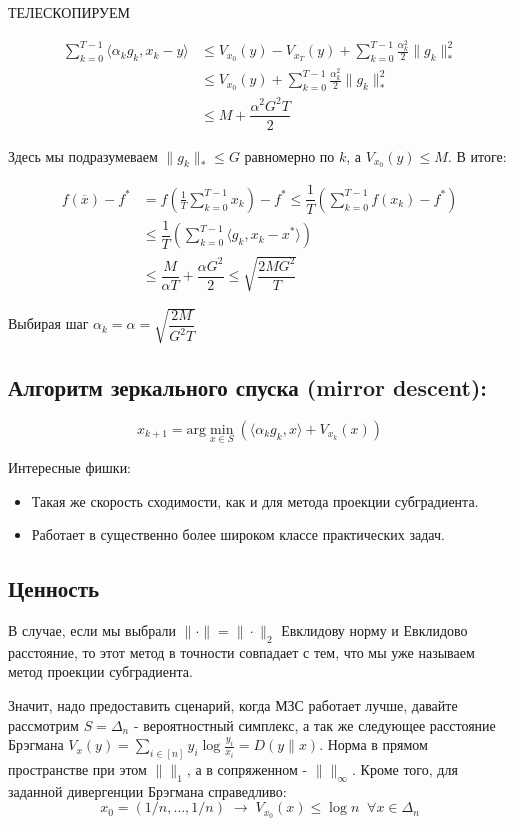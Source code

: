 \documentclass[a4paper,12pt]{article}
\theoremstyle{plain} %
\theoremstyle{definition} %
\theoremstyle{remark} %
\theoremstyle{definition}
\theoremstyle{definition}
\let\leq\leqslant
\begin{document}
ТЕЛЕСКОПИРУЕМ

\begin{align*}
\sum\limits_{k = 0}^{T-1} \langle \alpha_k g_k, x_k - y\rangle &\leq  V_{x_0}(y) - V_{x_{T}}(y) + \sum\limits_{k = 0}^{T-1}\frac{\alpha_k^2}{2} \|g_k\|_*^2 \\
&\leq V_{x_0}(y)  + \sum\limits_{k = 0}^{T-1}\frac{\alpha_k^2}{2} \|g_k\|_*^2 \\
&\leq M + \dfrac{\alpha^2 G^2 T}{2} 
\end{align*}

Здесь мы подразумеваем $\|g_k\|_* \leq G$ равномерно по $k$, а $V_{x_0}(y) \leq M$. В итоге:

\begin{align*}
f(\overline{x}) - f^* &= f \left( \frac{1}{T}\sum\limits_{k=0}^{T-1} x_k \right) - f^* \leq \dfrac{1}{T} \left( \sum\limits_{k=0}^{T-1} f(x_k) - f^* \right) \\
& \leq  \dfrac{1}{T} \left( \sum\limits_{k=0}^{T-1}\langle g_k, x_k - x^* \rangle\right) \\
& \leq \dfrac{M}{\alpha T} + \dfrac{\alpha G^2}{2} \leq \sqrt{\dfrac{2 M G^2}{T}}
\end{align*}

Выбирая шаг $\alpha_k = \alpha = \sqrt{\dfrac{2M}{G^2 T}}$

\subsection{Алгоритм зеркального спуска (mirror descent):}
$$
x_{k+1} = \text{arg}\min\limits_{x \in S} \left( \langle \alpha_k g_k, x \rangle + V_{x_k}(x) \right)
$$

Интересные фишки:
\begin{itemize}
    \item Такая же скорость сходимости, как и для метода проекции субградиента.
    \item Работает в существенно более широком классе практических задач.
\end{itemize}

\subsection{Ценность}

В случае, если мы выбрали $\|\cdot\| = \|\cdot\|_2$ Евклидову норму и Евклидово расстояние, то этот метод в точности совпадает с тем, что мы уже называем метод проекции субградиента. 

Значит, надо предоставить сценарий, когда МЗС работает лучше, давайте рассмотрим $S = \Delta_n$ - вероятностный симплекс, а так же следующее расстояние Брэгмана $V_x(y) = \sum_{i \in [n]} y_i \log \frac{y_i}{x_i} = D(y \| x)$. Норма в прямом пространстве при этом $\|\|_1$, а в сопряженном - $\|\|_\infty$. Кроме того, для заданной дивергенции Брэгмана справедливо:
$$
x_0 = \left( 1/n, \ldots, 1/n \right) \; \to \; V_{x_0}(x) \leq \log n \;\;\forall x \in \Delta_n
$$
\end{document}
